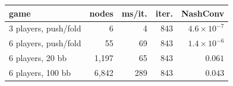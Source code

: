 \begin{tabular}{lrrrr}
\toprule
game & nodes & ms/it. & iter. & NashConv \\ \midrule
3 players, push/fold & 6 & 4 & 843 & $4.6\times10^{-7}$ \\
6 players, push/fold & 55 & 69 & 843 & $1.4\times10^{-6}$ \\
6 players, 20 bb & 1,197 & 65 & 843 & $0.061$ \\
6 players, 100 bb & 6,842 & 289 & 843 & $0.043$ \\
\bottomrule
\end{tabular}
